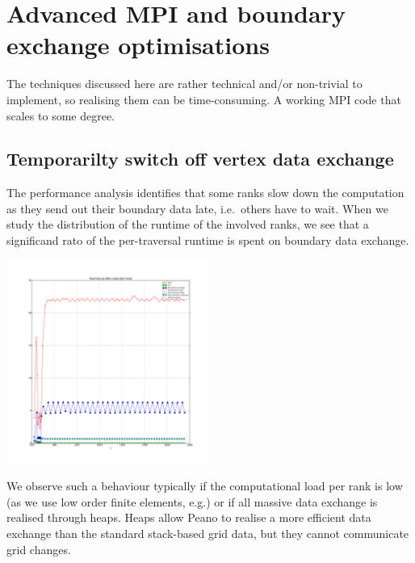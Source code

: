 \section{Advanced MPI and boundary exchange optimisations}


\chapterDescription
  {
    The techniques discussed here are rather technical and/or non-trivial to
    implement, so realising them can be time-consuming.
  }
  {
    A working MPI code that scales to some degree.
  }



\subsection{Temporarilty switch off vertex data exchange}
\label{section:64_advanced-mpi:switch-off-vertex-data-exchange}

\begin{smell}
  The performance analysis identifies that some ranks slow down the computation
  as they send out their boundary data late, i.e.~others have to wait. When we
  study the distribution of the runtime of the involved ranks, we see that a
  significand rato of the per-traversal runtime is spent on boundary data
  exchange.
\end{smell}


\begin{center}
  \includegraphics[width=0.5\textwidth]{64_advanced-mpi/boundary-exchange.pdf}
\end{center}


\noindent
We observe such a behaviour typically if the computational load per rank is low
(as we use low order finite elements, e.g.) or if all massive data exchange is
realised through heaps.
Heaps allow Peano to realise a more efficient data exchange than the standard
stack-based grid data, but they cannot communicate grid changes.

